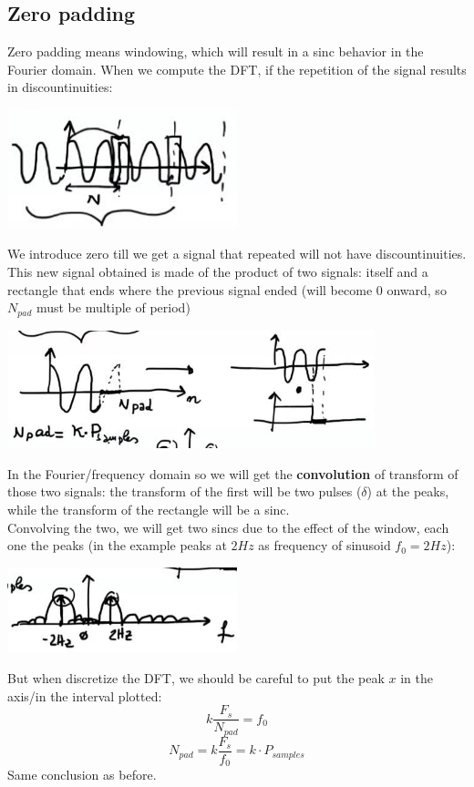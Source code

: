 \subsection{Zero padding}
Zero padding means windowing, which will result in a sinc behavior in the Fourier domain. When we compute the DFT, if the repetition of the signal results in discountinuities:
\begin{center}
    \includegraphics[width=0.5\textwidth]{images/zero_pad_01.png}
\end{center}
We introduce zero till we get a signal that repeated will not have discountinuities. This new signal obtained is made of the product of two signals: itself and a rectangle that ends where the previous signal ended (will become 0 onward, so $N_{pad}$ must be multiple of period)
\begin{center}
    \includegraphics[width=0.8\textwidth]{images/zero_pad_02.png}
\end{center}
In the Fourier/frequency domain so we will get the \textbf{convolution} of transform of those two signals: the transform of the first will be two pulses ($\delta$) at the peaks, while the transform of the rectangle will be a sinc.\\
Convolving the two, we will get two sincs due to the effect of the window, each one the peaks (in the example peaks at $2Hz$ as frequency of sinusoid $f_0=2Hz$):
\begin{center}
    \includegraphics[width=0.5\textwidth]{images/zero_pad_03.png}
\end{center}
But when discretize the DFT, we should be careful to put the peak $x$ in the axis/in the interval plotted:
$$k\frac{F_s}{N_{pad}}=f_0$$
$$N_{pad}=k\frac{F_s}{f_0}=k\cdot P_{samples}$$
Same conclusion as before.

